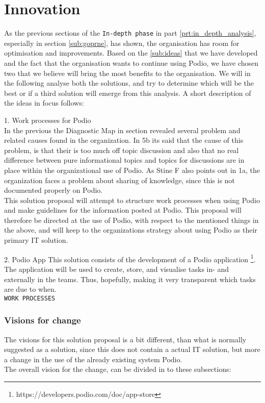 \part{Innovation}
As the previous sections of the \texttt{In-depth phase} in part \ref{prt:in_depth_analysis},
especially in section \ref{sub:goprne}, has shown,
the organisation has room for optimisation and improvements. Based on the \ref{sub:ideas} that we
have developed and the fact that the organisation wants to continue using Podio, we have chosen two that we believe will bring the most benefits to the organisation.
We will in the following analyse both the solutions, and try to determine which will be the best or
if a third solution will emerge from this analysis. A short description of the ideas in focus
follows:


1. Work processes for Podio\\
In the previous the Diagnostic Map in section revealed several problem and related causes found in the organization. In 5b its said that the cause of this problem, is that their is too much off topic discussion and also that no real difference between pure informational topics and topics for discussions are in place within the organizational use of Podio. As Stine F also points out in 1a, the organization faces a problem about sharing of knowledge, since this is not documented properly on Podio.\\

This solution proposal will attempt to structure work processes when using Podio and make guidelines for the information posted at Podio. This proposal will therefore be directed at the use of Podio, with respect to the mentioned things in the above, and will keep to the organizations strategy about using Podio as their primary IT solution. 

2. Podio App
This solution consists of the development of a Podio application \footnote{https://developers.podio.com/doc/app-store}.
The application will be used to create, store, and visualise tasks in- and externally in the teams.
Thus, hopefully, making it very transparent which tasks are due to when.\\

\texttt{WORK PROCESSES}
\section{Visions for change}
The visions for this solution proposal is a bit different, than what is normally suggested as a solution, since this does not contain a actual IT solution, but more a change in the use of the already existing system Podio.\\
The overall vision for the change, can be divided in to these subsections:

